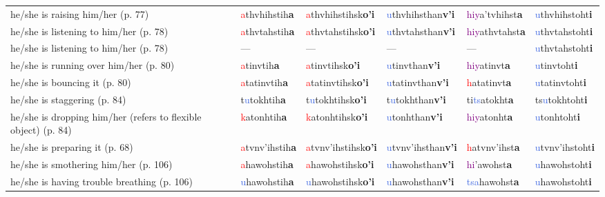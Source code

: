 \documentclass[oneside,openany]{book}%
\begin{document}
\begin{tabularx}{\textwidth}{>{\hsize=1.5\hsize\RaggedRight}X >{\hsize=0.9\hsize}X >{\hsize=0.9\hsize}X >{\hsize=0.9\hsize}X >{\hsize=0.9\hsize}X >{\hsize=0.9\hsize}X}
he/she is raising him/her (p. 77)&\textcolor{Red}{a}thvhihstih\textbf{a}&\textcolor{Red}{a}thvhihstihsk\textbf{o'i}&\textcolor{RoyalBlue}{u}thvhihsthan\textbf{v'i}&\textcolor{Purple}{hiy}a'tvhihst\textbf{a}&\textcolor{RoyalBlue}{u}thvhihstoht\textbf{i}\\%
he/she is listening to him/her (p. 78)&\textcolor{Red}{a}thvtahstih\textbf{a}&\textcolor{Red}{a}thvtahstihsk\textbf{o'i}&\textcolor{RoyalBlue}{u}thvtahsthan\textbf{v'i}&\textcolor{Purple}{hiy}athvtahst\textbf{a}&\textcolor{RoyalBlue}{u}thvtahstoht\textbf{i}\\%
he/she is listening to him/her (p. 78)&---&---&---&---&\textcolor{RoyalBlue}{u}thvtahstoht\textbf{i}\\%
he/she is running over him/her (p. 80)&\textcolor{Red}{a}tinvtih\textbf{a}&\textcolor{Red}{a}tinvtihsk\textbf{o'i}&\textcolor{RoyalBlue}{u}tinvthan\textbf{v'i}&\textcolor{Purple}{hiy}atinvt\textbf{a}&\textcolor{RoyalBlue}{u}tinvtoht\textbf{i}\\%
he/she is bouncing it (p. 80)&\textcolor{Red}{a}tatinvtih\textbf{a}&\textcolor{Red}{a}tatinvtihsk\textbf{o'i}&\textcolor{RoyalBlue}{u}tatinvthan\textbf{v'i}&\textcolor{Red}{h}atatinvt\textbf{a}&\textcolor{RoyalBlue}{u}tatinvtoht\textbf{i}\\%
he/she is staggering (p. 84)&t\textcolor{RoyalBlue}{u}tokhtih\textbf{a}&t\textcolor{RoyalBlue}{u}tokhtihsk\textbf{o'i}&t\textcolor{RoyalBlue}{u}tokhthan\textbf{v'i}&ti\textcolor{RoyalBlue}{ts}atokht\textbf{a}&ts\textcolor{RoyalBlue}{u}tokhtoht\textbf{i}\\%
he/she is dropping him/her (refers to flexible object) (p. 84)&\textcolor{Red}{k}atonhtih\textbf{a}&\textcolor{Red}{k}atonhtihsk\textbf{o'i}&\textcolor{RoyalBlue}{u}tonhthan\textbf{v'i}&\textcolor{Purple}{hiy}atonht\textbf{a}&\textcolor{RoyalBlue}{u}tonhtoht\textbf{i}\\%
he/she is preparing it (p. 68)&\textcolor{Red}{a}tvnv'ihstih\textbf{a}&\textcolor{Red}{a}tvnv'ihstihsk\textbf{o'i}&\textcolor{RoyalBlue}{u}tvnv'ihsthan\textbf{v'i}&\textcolor{Red}{h}atvnv'ihst\textbf{a}&\textcolor{RoyalBlue}{u}tvnv'ihstoht\textbf{i}\\%
he/she is smothering him/her (p. 106)&\textcolor{Red}{a}hawohstih\textbf{a}&\textcolor{Red}{a}hawohstihsk\textbf{o'i}&\textcolor{RoyalBlue}{u}hawohsthan\textbf{v'i}&\textcolor{Purple}{hi}'awohst\textbf{a}&\textcolor{RoyalBlue}{u}hawohstoht\textbf{i}\\%
he/she is having trouble breathing (p. 106)&\textcolor{RoyalBlue}{u}hawohstih\textbf{a}&\textcolor{RoyalBlue}{u}hawohstihsk\textbf{o'i}&\textcolor{RoyalBlue}{u}hawohsthan\textbf{v'i}&\textcolor{RoyalBlue}{tsa}hawohst\textbf{a}&\textcolor{RoyalBlue}{u}hawohstoht\textbf{i}\\%

\end{tabularx}
\end{document}
